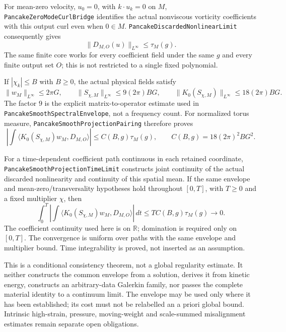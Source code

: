 \documentclass[11pt]{article}
\theoremstyle{definition}
\begin{document}
For mean-zero velocity, $u_0=0$, with $k\cdot u_k=0$ on $M$,
\texttt{PancakeZeroModeCurlBridge} identifies the actual nonviscous
vorticity coefficients with this output curl even when $0\in M$.
\texttt{PancakeDiscardedNonlinearLimit} consequently gives
\[
 \|D_{M,O}(u)\|_{L^\infty}\le\tau_M(g).
\]
The same finite core works for every coefficient field under the same
$g$ and every finite output set $O$; this is not restricted to a single
fixed polynomial.

If $|\chi_k|\le B$ with $B\ge0$, the actual physical fields satisfy
\[
 \|w_M\|_{L^\infty}\le2\pi G,\qquad
 \|S_{\chi,M}\|_{L^\infty}\le9(2\pi)BG,\qquad
 \|K_0(S_{\chi,M})\|_{L^\infty}\le18(2\pi)BG.
\]
The factor $9$ is the explicit matrix-to-operator estimate used in
\texttt{PancakeSmoothSpectralEnvelope}, not a frequency count.
For normalized torus measure, \texttt{PancakeSmoothProjectionPairing}
therefore proves
\[
 \left|\int\langle K_0(S_{\chi,M})w_M,D_{M,O}\rangle\right|
 \le C(B,g)\tau_M(g),\qquad C(B,g)=18(2\pi)^2BG^2.
\]

For a time-dependent coefficient path continuous in each retained
coordinate, \texttt{PancakeSmoothProjectionTimeLimit} constructs joint
continuity of the actual discarded nonlinearity and continuity of this
spatial mean. If the same envelope and mean-zero/transversality hypotheses
hold throughout $[0,T]$, with $T\ge0$ and a fixed multiplier $\chi$, then
\[
 \boxed{\quad
 \int_0^T\left|\int\langle K_0(S_{\chi,M})w_M,D_{M,O}\rangle\right|\,dt
 \le T C(B,g)\tau_M(g)\longrightarrow0.
 \quad}
\]
The coefficient continuity used here is on $\mathbb R$; domination is
required only on $[0,T]$. The convergence is uniform over paths with the
same envelope and multiplier bound. Time integrability is proved, not
inserted as an assumption.

This is a conditional consistency theorem, not a global regularity
estimate. It neither constructs the common envelope from a solution,
derives it from kinetic energy, constructs an arbitrary-data Galerkin
family, nor passes the complete material identity to a continuum limit.
The envelope may be used only where it has been established; its cost
must not be relabelled an a priori global bound. Intrinsic high-strain,
pressure, moving-weight and scale-summed misalignment estimates remain
separate open obligations.
\end{document}
